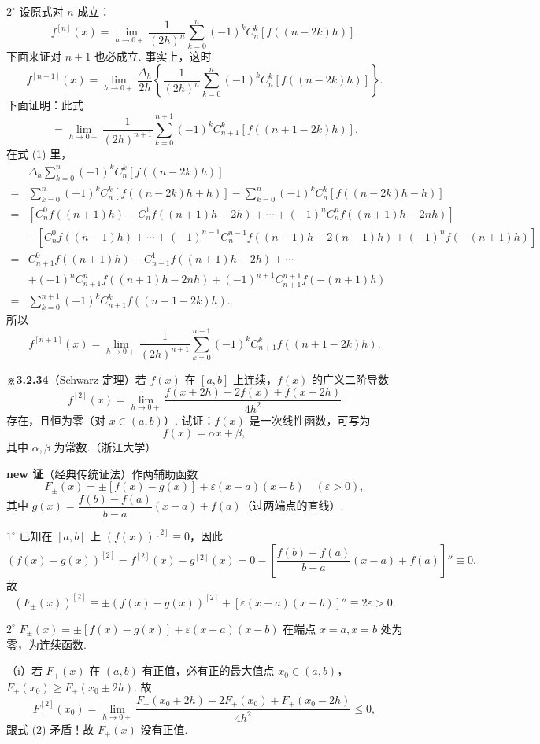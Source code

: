 \documentclass[UTF8,12pt,a4paper,fontset=fandol]{ctexart}
\begin{document}
$2^\circ$ 设原式对 $n$ 成立：
\[
  f^{[n]}(x)=\lim_{h\to0+}\frac1{(2h)^n}
  \sum_{k=0}^n(-1)^kC_n^k[f((n-2k)h)].
\tag{1}
\]
下面来证对 $n+1$ 也必成立. 事实上，这时
\[
  f^{[n+1]}(x)=
  \lim_{h\to0+}\frac{\Delta_h}{2h}
  \left\{\frac1{(2h)^n}\sum_{k=0}^n(-1)^kC_n^k[f((n-2k)h)]\right\}.
\]
下面证明：此式
\[
  =
  \lim_{h\to0+}\frac1{(2h)^{n+1}}
  \sum_{k=0}^{n+1}(-1)^kC_{n+1}^k[f((n+1-2k)h)].
\]
在式 (1) 里，
\[
\begin{aligned}
&\Delta_h\sum_{k=0}^n(-1)^kC_n^k[f((n-2k)h)]\\
={}&
\sum_{k=0}^n(-1)^kC_n^k[f((n-2k)h+h)]
-
\sum_{k=0}^n(-1)^kC_n^k[f((n-2k)h-h)]\\
={}&[C_n^0f((n+1)h)-C_n^1f((n+1)h-2h)+\cdots+(-1)^nC_n^nf((n+1)h-2nh)]\\
&-[C_n^0f((n-1)h)+\cdots+(-1)^{n-1}C_n^{n-1}f((n-1)h-2(n-1)h)+(-1)^nf(-(n+1)h)]\\
={}&
C_{n+1}^0f((n+1)h)-C_{n+1}^1f((n+1)h-2h)+\cdots\\
&+(-1)^nC_{n+1}^nf((n+1)h-2nh)+(-1)^{n+1}C_{n+1}^{n+1}f(-(n+1)h)\\
={}&\sum_{k=0}^{n+1}(-1)^kC_{n+1}^kf((n+1-2k)h).
\end{aligned}
\]
所以
\[
  f^{[n+1]}(x)=
  \lim_{h\to0+}\frac1{(2h)^{n+1}}
  \sum_{k=0}^{n+1}(-1)^kC_{n+1}^kf((n+1-2k)h).
\]

\noindent\textbf{※3.2.34}\quad （Schwarz 定理）若 $f(x)$ 在 $[a,b]$ 上连续，$f(x)$ 的广义二阶导数
\[
  f^{[2]}(x)=\lim_{h\to0+}\frac{f(x+2h)-2f(x)+f(x-2h)}{4h^2}
\]
存在，且恒为零（对 $x\in(a,b)$）. 试证：$f(x)$ 是一次线性函数，可写为
\[
  f(x)=\alpha x+\beta,
\]
其中 $\alpha,\beta$ 为常数.（浙江大学）

\noindent\textbf{new 证}\quad （经典传统证法）作两辅助函数
\begin{equation}
  F_\pm(x)=\pm[f(x)-g(x)]+\varepsilon(x-a)(x-b)\quad(\varepsilon>0),
\tag{1}
\end{equation}
其中 $g(x)=\dfrac{f(b)-f(a)}{b-a}(x-a)+f(a)$（过两端点的直线）.

$1^\circ$ 已知在 $[a,b]$ 上 $(f(x))^{[2]}\equiv0$，因此
\[
  (f(x)-g(x))^{[2]}=f^{[2]}(x)-g^{[2]}(x)=0-\left[\frac{f(b)-f(a)}{b-a}(x-a)+f(a)\right]''\equiv0.
\]
故
\[
  (F_\pm(x))^{[2]}\equiv\pm(f(x)-g(x))^{[2]}+[\varepsilon(x-a)(x-b)]''\equiv2\varepsilon>0.
\tag{2}
\]

$2^\circ$ $F_\pm(x)=\pm[f(x)-g(x)]+\varepsilon(x-a)(x-b)$ 在端点 $x=a,x=b$ 处为零，为连续函数.

（i）若 $F_+(x)$ 在 $(a,b)$ 有正值，必有正的最大值点 $x_0\in(a,b)$，$F_+(x_0)\ge F_+(x_0\pm2h)$. 故
\[
  F_+^{[2]}(x_0)
  =
  \lim_{h\to0+}
  \frac{F_+(x_0+2h)-2F_+(x_0)+F_+(x_0-2h)}{4h^2}
  \le0,
\]
跟式 (2) 矛盾！故 $F_+(x)$ 没有正值.
\end{document}
